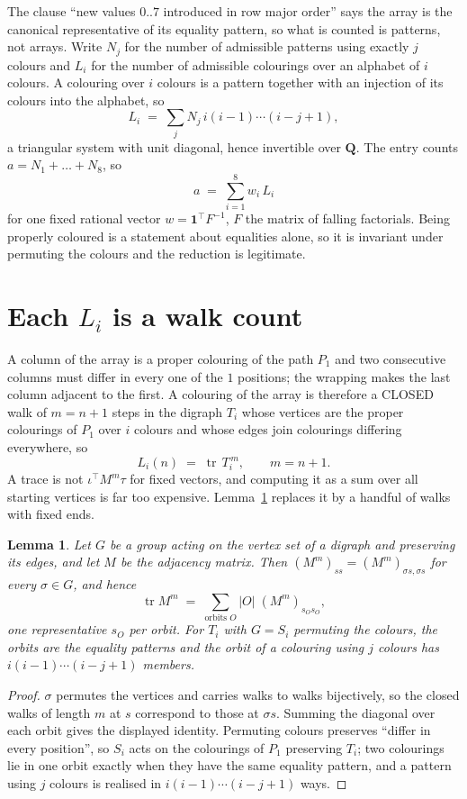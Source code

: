 \documentclass[11pt,a4paper]{article}
\theoremstyle{plain}
\newtheorem{lemma}[theorem]{Lemma}
\theoremstyle{definition}
\begin{document}
The clause ``new values $0..7$ introduced in row major order'' says the array is the
canonical representative of its equality pattern, so what is counted is patterns, not arrays.
Write $N_j$ for the number of admissible patterns using exactly $j$ colours and $L_i$ for the
number of admissible colourings over an alphabet of $i$ colours. A colouring over $i$ colours
is a pattern together with an injection of its colours into the alphabet, so
\[
L_i\;=\;\sum_j N_j\,i(i-1)\cdots(i-j+1),
\]
a triangular system with unit diagonal, hence invertible over $\mathbf{Q}$. The entry counts
$a=N_1+\dots+N_{8}$, so
\[
a\;=\;\sum_{i=1}^{8}w_i\,L_i
\]
for one fixed rational vector $w=\mathbf{1}^{\!\top}F^{-1}$, $F$ the matrix of falling
factorials. Being properly coloured is a statement about equalities alone, so it is invariant
under permuting the colours and the reduction is legitimate.

\section{Each $L_i$ is a walk count}

A column of the array is a proper colouring of the path $P_{1}$ and two consecutive
columns must differ in every one of the $1$ positions; the wrapping makes the last column
adjacent to the first. A colouring of the array is therefore a CLOSED walk of $m=n+1$ steps
in the digraph $T_i$ whose vertices are the proper colourings of $P_{1}$ over $i$ colours
and whose edges join colourings differing everywhere, so
\[
L_i(n)\;=\;\operatorname{tr}\,T_i^{\,m},\qquad m=n+1.
\]
A trace is not $\iota^{\!\top}M^m\tau$ for fixed vectors, and computing it as a sum over all
starting vertices is far too expensive. Lemma~\ref{lem:trace} replaces it by a handful of
walks with fixed ends.

\begin{lemma}\label{lem:trace}
Let $G$ be a group acting on the vertex set of a digraph and preserving its edges, and let $M$
be the adjacency matrix. Then $(M^m)_{ss}=(M^m)_{\sigma s,\sigma s}$ for every
$\sigma\in G$, and hence
\[
\operatorname{tr} M^m\;=\;\sum_{\text{orbits }O}|O|\;(M^m)_{s_O s_O} ,
\]
one representative $s_O$ per orbit. For $T_i$ with $G=S_i$ permuting the colours, the orbits
are the equality patterns and the orbit of a colouring using $j$ colours has
$i(i-1)\cdots(i-j+1)$ members.
\end{lemma}

\begin{proof}
$\sigma$ permutes the vertices and carries walks to walks bijectively, so the closed walks of
length $m$ at $s$ correspond to those at $\sigma s$. Summing the diagonal over each orbit
gives the displayed identity. Permuting colours preserves ``differ in every position'', so
$S_i$ acts on the colourings of $P_{1}$ preserving $T_i$; two colourings lie in one orbit
exactly when they have the same equality pattern, and a pattern using $j$ colours is realised
in $i(i-1)\cdots(i-j+1)$ ways.
\end{proof}
\end{document}
